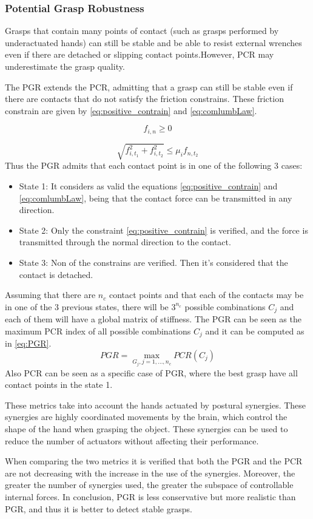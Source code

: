 \subsubsection{Potential Grasp Robustness}
Grasps that contain many points of contact (such as grasps performed by underactuated hands) can still be stable and be able to resist external wrenches even if there are detached or slipping contact points.However, PCR may underestimate the grasp quality.

The PGR extends the PCR, admitting that a grasp can still be stable even if there are contacts that do not satisfy the friction constrains. These friction constrain are given by \eqref{eq:positive_contrain} and \eqref{eq:comlumbLaw}.

\begin{equation}\label{eq:positive_contrain}
    f_{i,n} \ge 0
\end{equation}

\begin{equation}\label{eq:comlumbLaw}
    \sqrt{f_{i,t_1}^2+f_{i,t_2}^2} \le \mu_i  f_{n,t_2}
\end{equation}
Thus the PGR admits that each contact point is in one of the following 3 cases:
\begin{itemize}
    \item State 1: It considers as valid the equations \eqref{eq:positive_contrain} and \eqref{eq:comlumbLaw}, being that the contact force can be transmitted in any direction.
    \item State 2: Only the constraint \eqref{eq:positive_contrain} is verified, and the force is transmitted through the normal direction to the contact.
    \item State 3: Non of the constrains are verified. Then it's considered that the contact is detached.    
\end{itemize}
Assuming that there are $n_c$ contact points and that each of the contacts may be in one of the 3 previous states, there will be $3^{n_c}$ possible combinations $C_j$ and each of them will have a global matrix of stiffness.
The PGR can be seen as the maximum PCR index of all possible combinations $C_j$ and it can be computed as in \eqref{eq:PGR}.
\begin{equation}\label{eq:PGR}
    PGR = \max_{G_j, j=1,\dots, n_c}PCR(C_j)
\end{equation}
Also PCR can be seen as a specific case of PGR, where the best grasp have all contact points in the state 1.\par
These metrics take into account the hands actuated by postural synergies. These synergies are highly coordinated movements by the brain, which control the shape of the hand when grasping the object.
These synergies can be used to reduce the number of actuators without affecting their performance. \par
When comparing the two metrics it is verified that both the PGR and the PCR are not decreasing with the increase in the use of the synergies. Moreover, the greater the number of synergies used, the greater the subspace of controllable internal forces.
In conclusion, PGR is less conservative but more realistic than PGR, and thus it is better to detect stable grasps.
